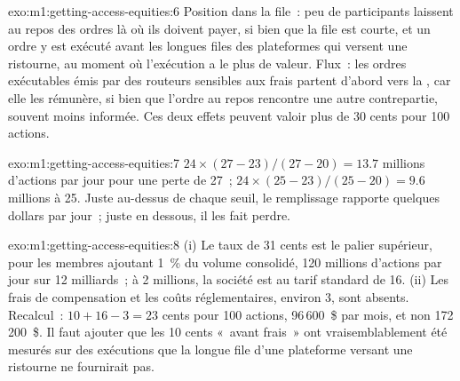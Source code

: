 \begin{solution}{exo:m1:getting-access-equities:6}
Position dans la file~: peu de participants laissent au repos des ordres là où ils doivent payer, si bien que la
file est courte, et un ordre y est exécuté avant les longues files des
plateformes qui versent une ristourne, au moment où l'exécution a le plus de valeur. Flux~: les ordres exécutables
émis par des routeurs sensibles aux frais partent d'abord vers la , car elle
les rémunère, si bien que l'ordre au repos rencontre une autre contrepartie, souvent moins
informée. Ces deux effets peuvent valoir plus de 30 cents pour 100 actions.
\end{solution}

\begin{solution}{exo:m1:getting-access-equities:7}
$24 \times (27 - 23)/(27 - 20) = 13.7$ millions d'actions par jour pour une perte de 27~;
$24 \times (25 - 23)/(25 - 20) = 9.6$ millions à 25. Juste au-dessus de chaque seuil, le remplissage
rapporte quelques dollars par jour~; juste en dessous, il les fait perdre.
\end{solution}

\begin{solution}{exo:m1:getting-access-equities:8}
(i) Le taux de 31 cents est le palier supérieur, pour les membres ajoutant 1~\% du
volume consolidé, 120 millions d'actions par jour sur 12 milliards~; à 2 millions, la société est au
tarif standard de 16. (ii) Les frais de compensation et les coûts réglementaires, environ 3, sont absents.
Recalcul~: $10 + 16 - 3 = 23$ cents pour 100 actions, 96\,600~\$ par mois, et non
172\,200~\$. Il faut ajouter que les 10 cents «~avant frais~» ont vraisemblablement été
mesurés sur des exécutions que la longue file d'une plateforme versant une ristourne ne fournirait pas.
\end{solution}


